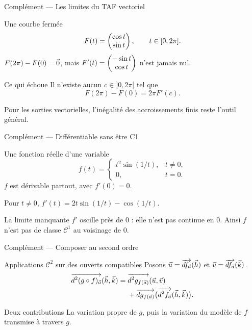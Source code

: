 \begin{frame}[t]{Complément — Les limites du TAF vectoriel}
\coursanalyse
\begin{exemple}{Une courbe fermée}
\[F(t)=\begin{pmatrix}\cos t\\\sin t\end{pmatrix},\qquad t\in[0,2\pi].\]
$F(2\pi)-F(0)=\vec 0$, mais $F'(t)=\begin{pmatrix}-\sin t\\\cos t\end{pmatrix}$ n'est jamais nul.
\end{exemple}
\begin{resultat}{Ce qui échoue}
Il n'existe aucun $c\in]0,2\pi[$ tel que
\[F(2\pi)-F(0)=2\pi F'(c).\]
\end{resultat}
\vfill Pour les sorties vectorielles, l'inégalité des accroissements finis reste l'outil général.
\end{frame}

\begin{frame}[t]{Complément — Différentiable sans être C1}
\coursanalyse
\begin{exemple}{Une fonction réelle d’une variable}
\[f(t)=\begin{cases}t^2\sin(1/t),&t\ne0,\\0,&t=0.\end{cases}\]
$f$ est dérivable partout, avec $f'(0)=0$.

\medskip
Pour $t\ne0$, $f'(t)=2t\sin(1/t)-\cos(1/t)$.
\end{exemple}
\begin{resultat}{La limite manquante}
$f'$ oscille près de $0$ : elle n'est pas continue en $0$. Ainsi $f$ n'est pas de classe $\mathcal C^1$ au voisinage de $0$.
\end{resultat}
\end{frame}

\begin{frame}[t]{Complément — Composer au second ordre}
\coursanalyse
\begin{theoreme}{Applications $\mathcal C^2$ sur des ouverts compatibles}
Posons $\vec u=\overrightarrow{df_{\vec a}}(\vec h)$ et $\vec v=\overrightarrow{df_{\vec a}}(\vec k)$.
\[\begin{aligned}
\overrightarrow{d^2(g\circ f)_{\vec a}}(\vec h,\vec k)
={}&\overrightarrow{d^2g_{f(\vec a)}}(\vec u,\vec v)\\
&+\overrightarrow{dg_{f(\vec a)}}\bigl(\overrightarrow{d^2f_{\vec a}}(\vec h,\vec k)\bigr).
\end{aligned}\]
\end{theoreme}
\begin{resultat}{Deux contributions}
La variation propre de $g$, puis la variation du modèle de $f$ transmise à travers $g$.
\end{resultat}
\end{frame}

